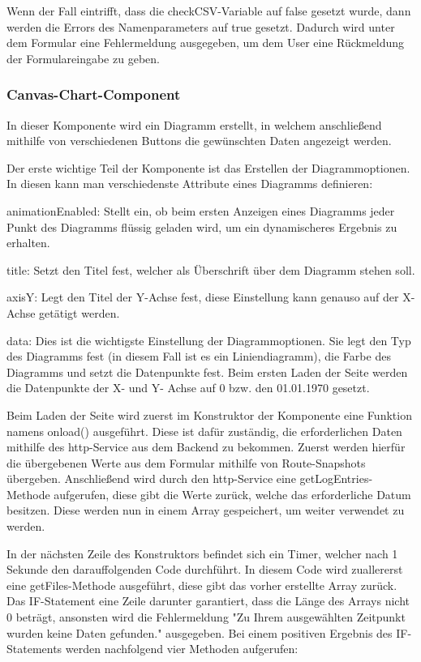 Wenn der Fall eintrifft, dass die checkCSV-Variable auf false gesetzt wurde, dann werden die Errors des Namenparameters auf true gesetzt. Dadurch wird unter dem Formular eine Fehlermeldung ausgegeben, um dem User eine Rückmeldung der Formulareingabe zu geben.
 
\subsubsection{Canvas-Chart-Component}
 
In dieser Komponente wird ein Diagramm erstellt, in welchem anschließend mithilfe von verschiedenen Buttons die gewünschten Daten angezeigt werden. 
 
Der erste wichtige Teil der Komponente ist das Erstellen der Diagrammoptionen. In diesen kann man verschiedenste Attribute eines Diagramms definieren:
 
\begin{compactitem}
    \item animationEnabled: Stellt ein, ob beim ersten Anzeigen eines Diagramms jeder Punkt des Diagramms flüssig geladen wird, um ein dynamischeres Ergebnis zu erhalten.   
    \item title: Setzt den Titel fest, welcher als Überschrift über dem Diagramm stehen soll.         
    \item axisY: Legt den Titel der Y-Achse fest, diese Einstellung kann genauso auf der X-Achse getätigt werden.   
    \item data: Dies ist die wichtigste Einstellung der Diagrammoptionen. Sie legt den Typ des Diagramms fest (in diesem Fall ist es ein Liniendiagramm), die Farbe des Diagramms und setzt die Datenpunkte fest. Beim ersten Laden der Seite werden die Datenpunkte der X- und Y- Achse auf 0 bzw. den 01.01.1970 gesetzt.
\end{compactitem}
 
Beim Laden der Seite wird zuerst im Konstruktor der Komponente eine Funktion namens onload() ausgeführt. Diese ist dafür zuständig, die erforderlichen Daten mithilfe des http-Service aus dem Backend zu bekommen. Zuerst werden hierfür die übergebenen Werte aus dem Formular mithilfe von Route-Snapshots übergeben. Anschließend wird durch den http-Service eine getLogEntries-Methode aufgerufen, diese gibt die Werte zurück, welche das erforderliche Datum besitzen. Diese werden nun in einem Array gespeichert, um weiter verwendet zu werden.
 
In der nächsten Zeile des Konstruktors befindet sich ein Timer, welcher nach 1 Sekunde den darauffolgenden Code durchführt. In diesem Code wird zuallererst eine getFiles-Methode ausgeführt, diese gibt das vorher erstellte Array zurück. Das IF-Statement eine Zeile darunter garantiert, dass die Länge des Arrays nicht 0 beträgt, ansonsten wird die Fehlermeldung "Zu Ihrem ausgewählten Zeitpunkt wurden keine Daten gefunden." ausgegeben. Bei einem positiven Ergebnis des IF-Statements werden nachfolgend vier Methoden aufgerufen:
 
